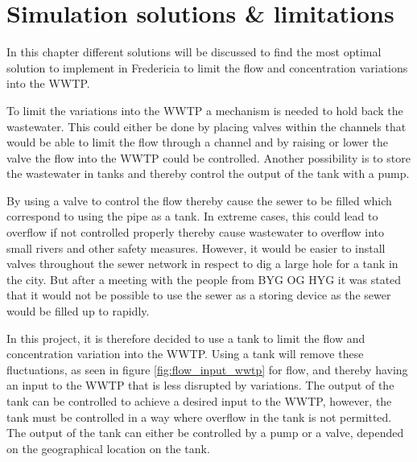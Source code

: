 
\chapter{Simulation solutions \& limitations }\label{ch:simulation_solution_and_limitation}
In this chapter different solutions will be discussed to find the most optimal solution to implement in Fredericia to limit the flow and concentration variations into the WWTP.

To limit the variations into the WWTP a mechanism is needed to hold back the wastewater. This could either be done by placing valves within the channels that would be able to limit the flow through a channel and by raising or lower the valve the flow into the WWTP could be controlled. Another possibility is to store the wastewater in tanks and thereby control the output of the tank with a pump. 

By using a valve to control the flow thereby cause the sewer to be filled which correspond to using the pipe as a tank. In extreme cases, this could lead to overflow if not controlled properly thereby cause wastewater to overflow into small rivers and other safety measures. However, it would be easier to install valves throughout the sewer network in respect to dig a large hole for a tank in the city. But after a meeting with the people from BYG OG HYG  it was stated that it would not be possible to use the sewer as a storing device as the sewer would be filled up to rapidly.     

In this project, it is therefore decided to use a tank to limit the flow and concentration variation into the WWTP. Using a tank will remove these fluctuations, as seen in figure \ref{fig:flow_input_wwtp} for flow, and thereby having an input to the WWTP that is less disrupted by variations. The output of the tank can be controlled to achieve a desired input to the WWTP, however, the tank must be controlled in a way where overflow in the tank is not permitted. The output of the tank can either be controlled by a pump or a valve, depended on the geographical location on the tank. 